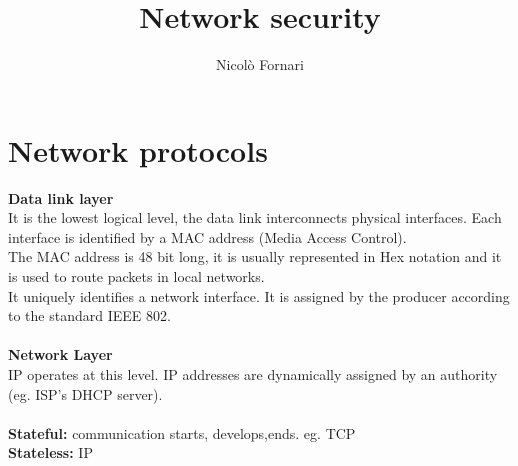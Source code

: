 \documentclass[10pt,a4paper]{article}
\author{Nicolò Fornari}
\title{Network security}
\begin{document}
\maketitle
\section{Network protocols}
\textbf{Data link layer}\\
It is the lowest logical level, the data link interconnects physical interfaces. Each interface is identified by a MAC address (Media Access Control).\\
The MAC address is 48 bit long, it is usually represented in Hex notation and it is used to route packets in local networks.\\
It uniquely identifies a network interface. It is assigned by the producer according to the standard IEEE 802.\\\\
\textbf{Network Layer}\\
IP operates at this level. IP addresses are dynamically assigned by an authority (eg. ISP's DHCP server).\\\\
\textbf{Stateful:} communication starts, develops,ends. eg. TCP\\
\textbf{Stateless:} IP\\
\newpage
\end{document}
